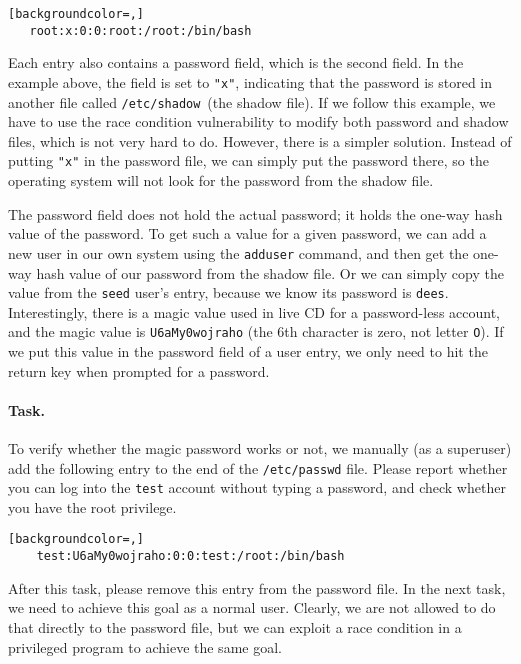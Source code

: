 \begin{lstlisting}[backgroundcolor=,]
   root:x:0:0:root:/root:/bin/bash
\end{lstlisting}

Each entry also contains a password field, which is the second field. In the example above, the
field is set to \texttt{"x"}, indicating that the password is stored in another file called
\texttt{/etc/shadow}~(the shadow file). If we follow this example, we have to use the race condition
vulnerability to modify both password and shadow files, which is not
very hard to do. However, there is a simpler solution. Instead of putting \texttt{"x"} in the
password file, we can simply put the password there, so the operating system will not look for
the password from the shadow file.

The password field does not hold the actual password; it holds the one-way hash value of the
password. To get such a value for a given password, we can add a new user in our own system using
the \texttt{adduser} command, and then get the one-way hash value of our password from
the shadow file.  Or we can simply copy the value from the \texttt{seed} user's entry,
because we know its password is \texttt{dees}. Interestingly, there is a magic value
used in \ubuntu live CD for a password-less account, and the magic value is
\texttt{U6aMy0wojraho} (the 6th character is zero, not letter \texttt{O}). If we put this value
in the password field of a user entry, we only need to hit the return key when prompted for
a password.


\paragraph{Task.} To verify whether the magic password works or not, we
manually (as a superuser) add the following entry to the end of the \texttt{/etc/passwd} file. 
Please report whether you can log into the \texttt{test} account without
typing a password, and check whether you have the root privilege.

\begin{lstlisting}[backgroundcolor=,]
    test:U6aMy0wojraho:0:0:test:/root:/bin/bash
\end{lstlisting}

After this task, please remove this entry from the password file. In the
next task, we need to achieve this goal as a normal user. Clearly, we are
not allowed to do that directly to the password file, but we can exploit a
race condition in a privileged program to achieve the same goal.



